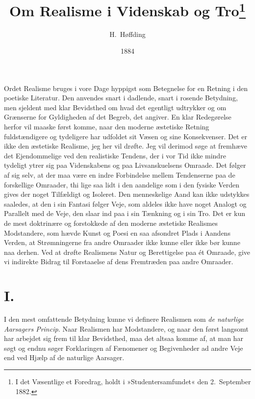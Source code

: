 \documentclass[12pt,a4paper]{article}
\title{\textbf{Om Realisme i Videnskab og Tro}\footnote{I det
Væsentlige et Foredrag, holdt i »Studentersamfundet« den 2.\ September
1882.}}
\author{H.\ Høffding}
\date{1884}
\newcommand{\opage}[1]{\marginnote{\footnotesize\textit{[#1]}}}
\begin{document}
\maketitle
\thispagestyle{fancy} \opage{1}

\bigskip

\noindent Ordet Realisme bruges i vore Dage hyppigst som Betegnelse for
en Retning i den poetiske Literatur. Den anvendes snart i dadlende,
snart i rosende Betydning, men sjeldent med klar Bevidsthed om hvad det
egentligt udtrykker og om Grænserne for Gyldigheden af det Begreb, det
angiver. En klar Redegørelse herfor vil maaske først komme, naar den
moderne æstetiske Retning fuldstændigere og tydeligere har udfoldet sit
Væsen og sine Konsekvenser. Det er ikke den æstetiske Realisme, jeg her
vil drøfte. Jeg vil derimod søge at fremhæve det Ejendommelige ved den
realistiske Tendens, der i vor Tid ikke mindre tydeligt ytrer sig paa
Videnskabens og paa Livsanskuelsens Omraade. Det følger af sig selv, at
der maa være en indre Forbindelse mellem Tendenserne paa de forskellige
Omraader, thi lige saa lidt i den aandelige som i den fysiske Verden
gives der noget Tilfældigt og Isoleret. Den menneskelige Aand kan ikke
udstykkes saaledes, at den i sin Fantasi følger Veje, som aldeles ikke
have noget Analogt og Parallelt med de Veje, den slaar ind paa i sin
Tænkning og i sin Tro. Det er kun de mest doktrinære og forstokkede af
den moderne æstetiske Realismes Modstandere, som hævde Kunst og Poesi
en saa afsondret Plads i Aandens Verden, at Strømningerne fra andre
Omraader ikke kunne eller ikke bør kunne naa derhen. Ved at drøfte
Realismens Natur og Berettigelse paa ét Omraade, give vi indirekte
Bidrag til Forstaaelse af dens Fremtræden paa andre Omraader.

\section*{I.}
\opage{2}I den mest omfattende Betydning kunne vi definere Realismen som \emph{de
naturlige Aarsagers Princip.} Naar Realismen har Modstandere, og naar
den først langsomt har arbejdet sig frem til klar Bevidsthed, maa det
altsaa komme af, at man har søgt og endnu søger Forklaringen af
Fænomener og Begivenheder ad andre Veje end ved Hjælp af de naturlige
Aarsager.
\end{document}
